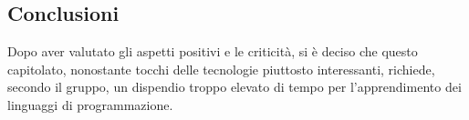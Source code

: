   \subsection{Conclusioni}
Dopo aver valutato gli aspetti positivi e le criticità, si è deciso che questo capitolato, nonostante tocchi delle tecnologie piuttosto interessanti, richiede, secondo il gruppo, un dispendio troppo elevato di tempo per l'apprendimento dei linguaggi di programmazione.
